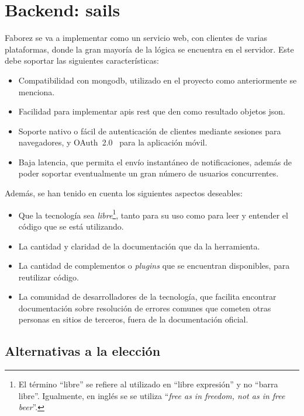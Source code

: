 \documentclass[main]{subfiles}
\begin{document}
\section[Backend: Sails.js]{Backend: \gls{sails}}
\label{sec:tech-sails}

Faborez se va a implementar como un servicio web, con clientes de varias plataformas, donde la gran mayoría de la lógica se encuentra en el servidor. Este debe soportar las siguientes características:

\begin{itemize}
  \item Compatibilidad con \gls{mongodb}, utilizado en el proyecto como anteriormente se menciona.
  \item Facilidad para implementar \glspl{api} \gls{rest} que den como resultado objetos \gls{json}.
  \item Soporte nativo o fácil de autenticación de clientes mediante sesiones para navegadores, y OAuth~2.0~\autocite{oauthrfc} para la aplicación móvil.
  \item Baja latencia, que permita el envío instantáneo de notificaciones, además de poder soportar eventualmente un gran número de usuarios concurrentes.
\end{itemize}

Además, se han tenido en cuenta los siguientes aspectos deseables:

\begin{itemize}
  \item Que la tecnología sea \emph{libre}\footnote{El término \enquote{libre} se refiere al utilizado en \enquote{libre expresión} y no \enquote{barra libre}. Igualmente, en inglés se se utiliza \enquote{\emph{free as in freedom, not as in free beer}}.}, tanto para su uso como para leer y entender el código que se está utilizando.
  \item La cantidad y claridad de la documentación que da la herramienta.
  \item La cantidad de complementos o \emph{plugins} que se encuentran disponibles, para reutilizar código.
  \item La comunidad de desarrolladores de la tecnología, que facilita encontrar documentación sobre resolución de errores comunes que cometen otras personas en sitios de terceros, fuera de la documentación oficial.
\end{itemize}

\subsection{Alternativas a la elección}
\end{document}
